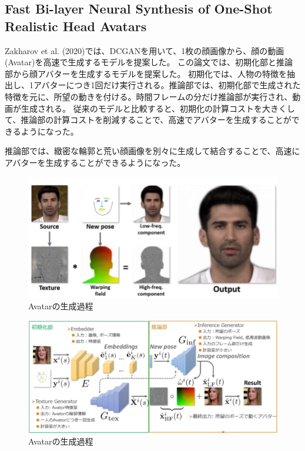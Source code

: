 \documentclass{ltjsarticle}
\begin{document}
\subsection{Fast Bi-layer Neural Synthesis of One-Shot Realistic Head Avatars}
Zakharov et al. (2020)では、DCGANを用いて、1枚の顔画像から、顔の動画(Avatar)を高速で生成するモデルを提案した。
この論文では、初期化部と推論部から顔アバターを生成するモデルを提案した。
初期化では、人物の特徴を抽出し、1アバターにつき1回だけ実行される。推論部では、初期化部で生成された特徴を元に、所望の動きを付ける。時間フレームの分だけ推論部が実行され、動画が生成される。
従来のモデルと比較すると、初期化の計算コストを大きくして、推論部の計算コストを削減することで、高速でアバターを生成することができるようになった。
\par
推論部では、緻密な輪郭と荒い顔画像を別々に生成して結合することで、高速にアバターを生成することができるようになった。
\begin{figure}[htbp]
  \centering
  \includegraphics[width=13cm]{./capture/Avatar.png}
  \caption{Avatarの生成過程}
  \label{fig:Avatar}
\end{figure}

\begin{figure}[htbp]
  \centering
  \includegraphics[width=13cm]{./capture/Avatar_Structure.png}
  \caption{Avatarの生成過程}
  \label{fig:Avatar2}
\end{figure}
\end{document}
